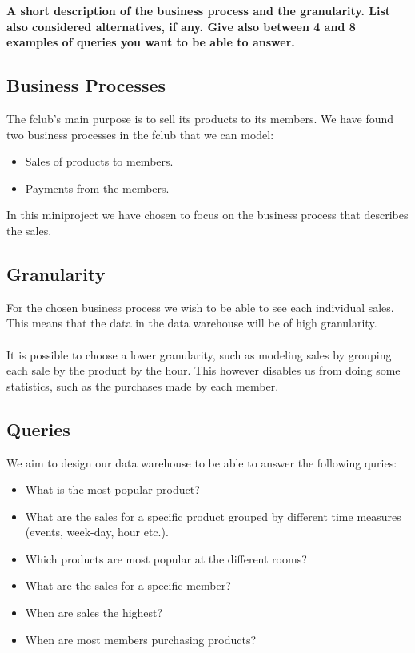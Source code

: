 \textbf{A short description of the business process and the granularity. 
List also considered alternatives, if any. 
Give also between 4 and 8 examples of queries you want to be able to answer.}

\subsection{Business Processes}
The fclub's main purpose is to sell its products to its members. 
We have found two business processes in the fclub that we can model:

\begin{itemize}
	\item Sales of products to members.
	\item Payments from the members.
\end{itemize}

In this miniproject we have chosen to focus on the business process that describes the sales. 


\subsection{Granularity}
For the chosen business process we wish to be able to see each individual sales.
This means that the data in the data warehouse will be of high granularity. \\
\\
It is possible to choose a lower granularity, such as modeling sales by grouping each sale by the product by the hour.
This however disables us from doing some statistics, such as the purchases made by each member. 


\subsection{Queries}
We aim to design our data warehouse to be able to answer the following quries:

\begin{itemize}
	\item What is the most popular product?
	\item What are the sales for a specific product grouped by different time measures (events, week-day, hour etc.).
	\item Which products are most popular at the different rooms?
	\item What are the sales for a specific member?
	\item When are sales the highest?
	\item When are most members purchasing products?
\end{itemize}

